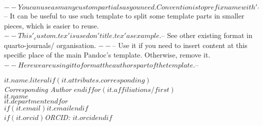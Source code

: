 $-- You can use as many custom partials as you need. Convention is to prefix name with '_'
$-- It can be useful to use such template to split some template parts in smaller pieces, which is easier to reuse. 
$-- This '_custom.tex' is used on 'title.tex' as example.
$-- See other existing format in quarto-journals/ organisation.
$-- %
$-- Use it if you need to insert content at this specific place of the main Pandoc's template. Otherwise, remove it.
$-- Here we are using it to format the authors part of the template.
$-- %

$it.name.literal$$if(it.attributes.corresponding)$\\ \itshape{Corresponding Author} $endif$$for(it.affiliations/first)$\\$it.name$\\$it.department$$endfor$\\$if(it.email)$\href{mailto:$it.email$}{$it.email$}$endif$\\$if(it.orcid)$ORCID: $it.orcid$$endif$